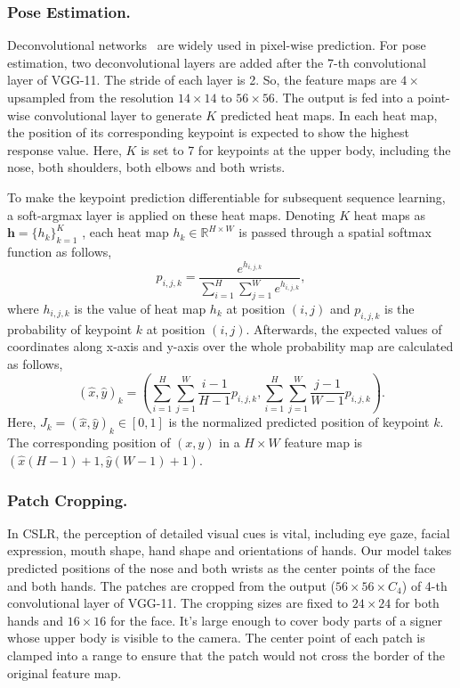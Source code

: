 \documentclass[letterpaper]{article} %
\begin{document}
\subsubsection{Pose Estimation.}
Deconvolutional networks~\cite{deconv} are widely used in pixel-wise prediction. For pose estimation, two deconvolutional layers are added after the 7-th convolutional layer of VGG-11. The stride of each layer is 2. So, the feature maps are $4\times$ upsampled from the resolution $14\times14$ to $56\times56$. The output is fed into a point-wise convolutional layer to generate $K$ predicted heat maps. In each heat map, the position of its corresponding keypoint is expected to show the highest response value. Here, $K$ is set to 7 for keypoints at the upper body, including the nose, both shoulders, both elbows and both wrists. 

To make the keypoint prediction differentiable for subsequent sequence learning, a soft-argmax layer is applied on these heat maps. Denoting $K$ heat maps as $\mathbf{h}=\{h_k\}_{k=1}^K$ , each heat map $h_k\in \mathbb{R}^{H\times W}$ is passed through a spatial softmax function as follows, 
\begin{equation} 
    p_{i,j,k}=\frac{e^{h_{i,j,k}}}{\sum_{i=1}^{H}{\sum_{j=1}^{W}{ e^{h_{i,j,k}} }} },
\end{equation}
where $h_{i,j,k}$ is the value of heat map $h_k$ at position $(i,j)$ and $p_{i, j, k}$ is the probability of keypoint $k$ at position $(i, j)$. Afterwards, the expected values of coordinates along x-axis and y-axis over the whole probability map are calculated as follows,
\begin{equation}
    (\hat{x}, \hat{y})_k \!=\! \left(\sum_{i=1}^{H}{\sum_{j=1}^{W}{ \frac{i\!-\!1}{H\!-\!1} p_{i,j,k} }}, \sum_{i=1}^{H}{\sum_{j=1}^{W}{ \frac{j\!-\!1}{W\!-\!1} p_{i,j,k} }}\right).
\end{equation}
Here, $J_k\!=\!(\hat{x},\hat{y})_k\in[0,1]$ is the normalized predicted position of keypoint $k$. The corresponding position of $(x, y)$ in a $H\times W$ feature map is $\left(\hat{x}(H\!-\!1)+1, \hat{y}(W\!-\!1)+1 \right)$.

\subsubsection{Patch Cropping.}
In CSLR, the perception of detailed visual cues is vital, including eye gaze, facial expression, mouth shape, hand shape and orientations of hands. 
Our model takes predicted positions of the nose and both wrists as the center points of the face and both hands. 
The patches are cropped from the output ($56\times 56\times C_4$) of 4-th convolutional layer of VGG-11. The cropping sizes are fixed to $24\times 24$ for both hands and $16\times16$ for the face. It's large enough to cover body parts of a signer whose upper body is visible to the camera. The center point of each patch is clamped into a range to ensure that the patch would not cross the border of the original feature map.
\end{document}
